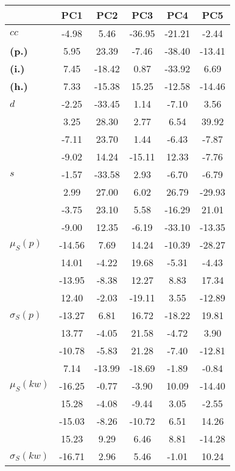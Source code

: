 \begin{table}[h!]
\begin{center}
\begin{tabular}{| l || c | c | c | c | c |}\hline
 & {\bf PC1} & {\bf PC2} & {\bf PC3} & {\bf PC4} & {\bf PC5} \\\hline\hline
{\bf $cc$} & -4.98 & 5.46 & -36.95 & -21.21 & -2.44 \\
{\bf (p.)} & 5.95 & 23.39 & -7.46 & -38.40 & -13.41 \\
{\bf (i.)} & 7.45 & -18.42 & 0.87 & -33.92 & 6.69 \\
{\bf (h.)} & 7.33 & -15.38 & 15.25 & -12.58 & -14.46 \\\hline
{\bf $d$} & -2.25 & -33.45 & 1.14 & -7.10 & 3.56 \\
{\bf } & 3.25 & 28.30 & 2.77 & 6.54 & 39.92 \\
{\bf } & -7.11 & 23.70 & 1.44 & -6.43 & -7.87 \\
{\bf } & -9.02 & 14.24 & -15.11 & 12.33 & -7.76 \\\hline
{\bf $s$} & -1.57 & -33.58 & 2.93 & -6.70 & -6.79 \\
{\bf } & 2.99 & 27.00 & 6.02 & 26.79 & -29.93 \\
 & -3.75  & 23.10  & 5.58  & -16.29  & 21.01 \\
 & -9.00  & 12.35  & -6.19  & -33.10  & -13.35 \\\hline
$\mu_S(p)$ & -14.56  & 7.69  & 14.24  & -10.39  & -28.27 \\
 & 14.01  & -4.22  & 19.68  & -5.31  & -4.43 \\
 & -13.95  & -8.38  & 12.27  & 8.83  & 17.34 \\
 & 12.40  & -2.03  & -19.11  & 3.55  & -12.89 \\\hline
$\sigma_S(p)$ & -13.27  & 6.81  & 16.72  & -18.22  & 19.81 \\
 & 13.77  & -4.05  & 21.58  & -4.72  & 3.90 \\
 & -10.78  & -5.83  & 21.28  & -7.40  & -12.81 \\
 & 7.14  & -13.99  & -18.69  & -1.89  & -0.84 \\\hline
$\mu_S(kw)$ & -16.25  & -0.77  & -3.90  & 10.09  & -14.40 \\
 & 15.28  & -4.08  & -9.44  & 3.05  & -2.55 \\
 & -15.03  & -8.26  & -10.72  & 6.51  & 14.26 \\
 & 15.23  & 9.29  & 6.46  & 8.81  & -14.28 \\\hline
$\sigma_S(kw)$ & -16.71  & 2.96  & 5.46  & -1.01  & 10.24 \\

\end{tabular}
\end{center}
\end{table}
